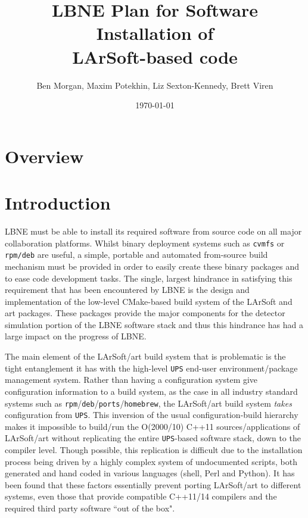 \documentclass[usletter]{article}
\newcommand{\code}[1]{\texttt{#1}}
\newcommand{\ups}{\code{UPS}\xspace}
\newcommand{\art}{art\xspace}
\newcommand{\larsoft}{LArSoft\xspace}
\begin{document}
\title{LBNE Plan for Software Installation of\\
  LArSoft-based code}
\author{Ben Morgan, Maxim Potekhin, Liz Sexton-Kennedy, Brett Viren}
\date{\today}
\maketitle
\tableofcontents

\section{Overview}

\section{Introduction}
LBNE must be able to install its required software from source code on
all major collaboration platforms\cite{docdb8035}.
Whilst binary deployment systems such as
\code{cvmfs} or \code{rpm/deb} are useful, a simple, portable and automated from-source build mechanism must
be provided in order to easily create these binary packages and to ease
code development tasks. The single, largest hindrance in
satisfying this requirement that has been encountered by LBNE is the design and implementation of the low-level
CMake-based build system of the \larsoft and \art packages.  These packages provide
the major components for the detector simulation portion of the LBNE software
stack and thus this hindrance has had a large impact on the progress of LBNE.

The main element of the \larsoft/\art build system that is problematic
is the tight entanglement it has with the high-level \ups end-user
environment/package management system. Rather than having a configuration system
give configuration information to a build system, as the case in all industry
standard systems such as \code{rpm}/\code{deb}/\code{ports}/\code{homebrew}, the \larsoft/\art
build system \textit{takes} configuration from \ups. This inversion of the usual
configuration-build hierarchy makes it impossible to build/run
the O(2000/10) C++11 sources/applications of \larsoft/\art
without replicating the entire \ups-based software stack, down to the compiler
level. Though possible, this replication is difficult due to the installation
process being driven by a highly complex system of undocumented scripts, both
generated and hand coded in various languages (shell, Perl and Python).
It has been found that these factors essentially prevent porting \larsoft/\art
to different systems, even those that provide compatible C++11/14 compilers
and the required third party software ``out of the box".
\end{document}
